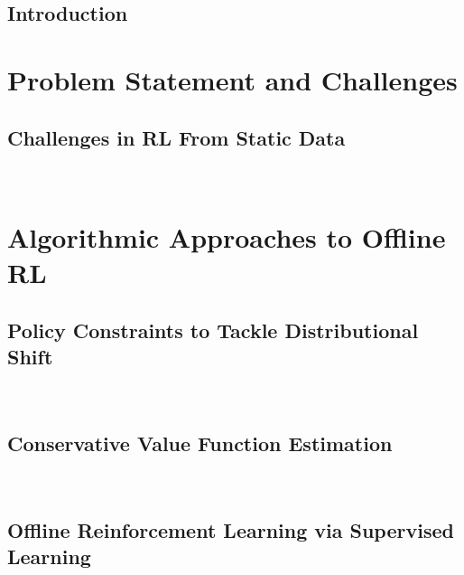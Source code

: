 \documentclass[letterpaper,12pt, oneside]{lib/ucthesis}
\begin{document}
\tableofcontents

\begin{acknowledgements}
\thispagestyle{plain}
	 
\end{acknowledgements}




\begin{dissertationText}

\chapter{Introduction}
	

\part{Problem Statement and Challenges}

\chapter{Challenges in RL From Static Data}~\label{chapter:diagnosing}
	

\part{Algorithmic Approaches to Offline RL}

\chapter{Policy Constraints to Tackle Distributional Shift}~\label{chapter:bear}
	

\chapter{Conservative Value Function Estimation}~\label{chapter:cql}
	

\chapter{Offline Reinforcement Learning via Supervised Learning}~\label{chapter:rcp}
	


\end{dissertationText}
\end{document}
